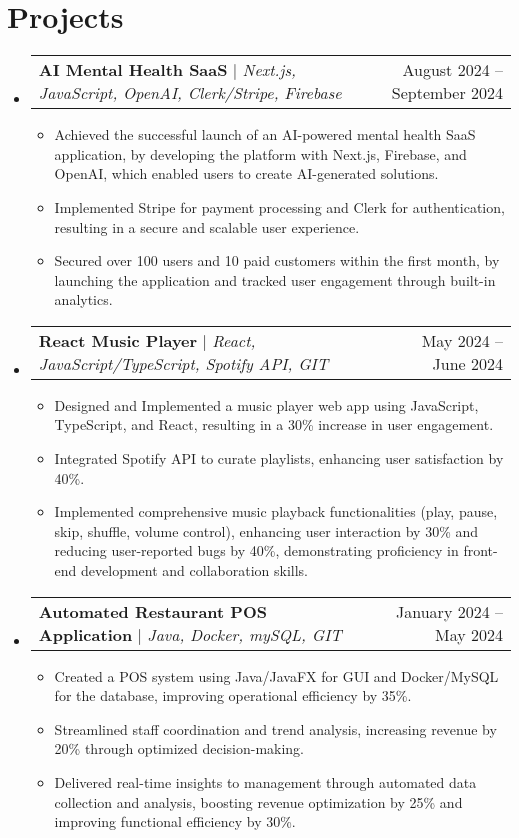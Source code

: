 \documentclass[letterpaper,11pt]{article}
\makeatletter
\newcommand{\resumeItem}[1]{
  \item\small{
    {#1 \vspace{-2pt}}
  }
}
\newcommand{\resumeProjectHeading}[2]{
    \item
    \begin{tabular*}{0.97\textwidth}{l@{\extracolsep{\fill}}r}
      \small#1 & #2 \\
    \end{tabular*}\vspace{-7pt}
}
\newcommand{\resumeSubHeadingListStart}{\begin{itemize}[leftmargin=0.15in, label={}]}
\newcommand{\resumeSubHeadingListEnd}{\end{itemize}}
\newcommand{\resumeItemListStart}{\begin{itemize}}
\newcommand{\resumeItemListEnd}{\end{itemize}\vspace{-5pt}}
\makeatother
\begin{document}
\section{Projects}
    \resumeSubHeadingListStart
      \resumeProjectHeading
          {\textbf{AI Mental Health SaaS} $|$ \emph{Next.js, JavaScript, OpenAI, Clerk/Stripe, Firebase}}{August 2024 -- September 2024}
          \resumeItemListStart
            \resumeItem{Achieved the successful launch of an AI-powered mental health SaaS application, by developing the platform with Next.js, Firebase, and OpenAI, which enabled users to create AI-generated solutions.}
            \resumeItem{Implemented Stripe for payment processing and Clerk for authentication, resulting in a secure and scalable user experience.}
            \resumeItem{Secured over 100 users and 10 paid customers within the first month, by launching the application and tracked user engagement through built-in analytics.}
          \resumeItemListEnd
      \resumeProjectHeading
          {\textbf{React Music Player} $|$ \emph{React, JavaScript/TypeScript, Spotify API, GIT}}{May 2024 -- June 2024}
          \resumeItemListStart
            \resumeItem{Designed and Implemented a music player web app using JavaScript, TypeScript, and React, resulting in a 30\% increase in user engagement.}
            \resumeItem{Integrated Spotify API to curate playlists, enhancing user satisfaction by 40\%.}
            \resumeItem{Implemented comprehensive music playback functionalities (play, pause, skip, shuffle, volume control), enhancing user interaction by 30\% and reducing user-reported bugs by 40\%, demonstrating proficiency in front-end development and collaboration skills.}
          \resumeItemListEnd
        \resumeProjectHeading
          {\textbf{Automated Restaurant POS Application} $|$ \emph{Java, Docker, mySQL, GIT}}{January 2024 -- May 2024}
          \resumeItemListStart
            \resumeItem{Created a POS system using Java/JavaFX for GUI and Docker/MySQL for the database, improving operational efficiency by 35\%.}
            \resumeItem{Streamlined staff coordination and trend analysis, increasing revenue by 20\% through optimized decision-making.}
            \resumeItem{Delivered real-time insights to management through automated data collection and analysis, boosting revenue optimization by 25\% and improving functional efficiency by 30\%.}
          \resumeItemListEnd
    \resumeSubHeadingListEnd



%
\end{document}
